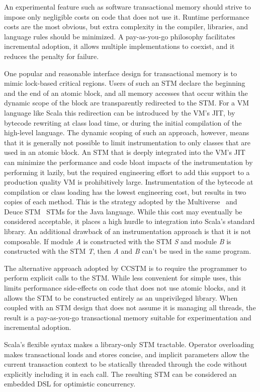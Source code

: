 
An experimental feature such as software transactional memory should
strive to impose only negligible costs on code that does not use it.
Runtime performance costs are the most obvious, but extra complexity in
the compiler, libraries, and language rules should be minimized.
A pay-as-you-go philosophy facilitates incremental adoption, it allows
multiple implementations to coexist, and it reduces the penalty for
failure.

One popular and reasonable interface design for transactional memory
is to mimic lock-based critical regions.  Users of such an STM declare
the beginning and the end of an atomic block, and all memory accesses
that occur within the dynamic scope of the block are transparently
redirected to the STM.  For a VM language like Scala this redirection
can be introduced by the VM's JIT, by bytecode rewriting at class
load time, or during the initial
compilation of the high-level language.  The dynamic scoping of such an approach,
however, means that it is generally not possible to
limit instrumentation to only classes that are used in an atomic block.
An STM that is deeply integrated into the VM's JIT can minimize the
performance and code bloat impacts of the instrumentation by performing it
lazily, but the required engineering effort to add this support
to a production quality VM is prohibitively large.  Instrumentation of
the bytecode at compilation or class loading has the lowest engineering
cost, but results in two copies of each method.
This is the strategy adopted by the Multiverse~\cite{multiverse} and
Deuce STM~\cite{deucestm} STMs for the Java language.
While this cost may eventually be considered acceptable, it places a
high hurdle to integration into Scala's standard library.
An additional drawback of
an instrumentation approach is that it is not composable.  If module
\textit{A} is constructed with the STM \textit{S} and module \textit{B}
is constructed with the STM \textit{T}, then \textit{A} and \textit{B}
can't be used in the same program.

The alternative approach adopted by CCSTM is to require the programmer to perform
explicit calls to the STM.  While less convenient for simple uses, this
limits performance side-effects on code that does not use atomic blocks, and it
allows the STM to be constructed entirely as an unprivileged library.
When coupled with an STM design that does not assume it is managing all
threads, the result is a pay-as-you-go transactional memory suitable
for experimentation and incremental adoption.

Scala's flexible syntax makes a library-only STM tractable.  Operator
overloading makes transactional loads and stores concise, and implicit
parameters allow the current transaction context to be statically
threaded through the code without explicitly including it in each call.
The resulting STM can be considered an embedded DSL
for optimistic concurrency.
